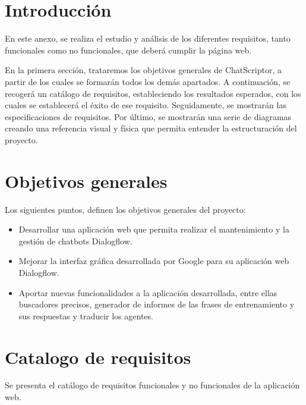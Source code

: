 
\section{Introducción}
En este anexo, se realiza el estudio y análisis de los diferentes requisitos, tanto funcionales como no funcionales, que deberá cumplir la página web. 

En la primera sección, trataremos los objetivos generales de ChatScriptor, a partir de los cuales se formarán todos los demás apartados. A continuación, se recogerá un catálogo de requisitos, estableciendo los resultados esperados, con los cuales se establecerá el éxito de ese requisito. Seguidamente, se mostrarán las especificaciones de requisitos. Por último, se mostrarán una serie de diagramas creando una referencia visual y física que permita entender la estructuración del proyecto.

\section{Objetivos generales}
Los siguientes puntos, definen los objetivos generales del proyecto:
\begin{itemize}
    \item Desarrollar una aplicación web que permita realizar el mantenimiento y la gestión de chatbots Dialogflow.
    \item Mejorar la interfaz gráfica desarrollada por Google para su aplicación web Dialogflow.
    \item Aportar nuevas funcionalidades a la aplicación desarrollada, entre ellas buscadores precisos, generador de informes de las frases de entrenamiento y sus respuestas y traducir los agentes.
\end{itemize}


\section{Catalogo de requisitos}
Se presenta el catálogo de requisitos funcionales y no funcionales de la aplicación web.

